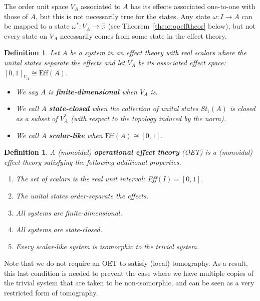 \documentclass[a4paper,onecolumn,10pt,accepted=2019-05-03, issue=1, volume=1, shorttitle=papers/compositionality-1-1]{compositionalityarticle}
\newcounter{counter}
\numberwithin{counter}{section}
\newtheorem{definition}[counter]{Definition}
\newcommand{\R}{\mathbb{R}}
\newcommand{\pred}{\text{Eff}}
\begin{document}
The order unit space $V_A$ associated to $A$ has its effects associated one-to-one with those of $A$, but this is not necessarily true for the states. Any state $\omega:I\rightarrow A$ can be mapped to a state $\omega^*:V_A\rightarrow \R$ (see Theorem~\ref{theor:opefftheor} below), but not every state on $V_A$ necessarily comes from some state in the effect theory.

\begin{definition}
    Let $A$ be a system in an effect theory with real scalars where the unital states separate the effects and let $V_A$ be its associated effect space: $[0,1]_{V_A} \cong \pred(A)$.
    \begin{itemize}
    \item We say $A$ is \textbf{finite-dimensional} when $V_A$ is.
    \item We call $A$ \textbf{state-closed} when the collection of unital states St$_1(A)$ is closed as a subset of $V_A^*$ (with respect to the topology induced by the norm). 
    \item We call $A$ \textbf{scalar-like} when $\pred(A) \cong [0,1]$.
    \end{itemize}
\end{definition}

\begin{definition}
    A (monoidal) \textbf{operational effect theory} (OET) is a (monoidal) effect theory satisfying the following additional properties.
    \begin{enumerate}
        \item The set of scalars is the real unit interval: Eff$(I)=[0,1]$.
        \item The unital states order-separate the effects.
        \item All systems are finite-dimensional.
        \item All systems are state-closed.
        \item Every scalar-like system is isomorphic to the trivial system.
    \end{enumerate}
\end{definition}
Note that we do not require an OET to satisfy (local) tomography. As a result, this last condition is needed to prevent the case where we have multiple copies of the trivial system that are taken to be non-isomorphic, and can be seen as a very restricted form of tomography.
\end{document}
